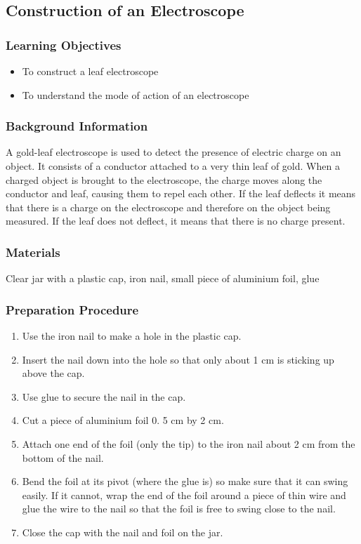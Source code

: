 \subsection{Construction of an Electroscope}

\subsubsection*{Learning Objectives}
\begin{itemize}
\item{To construct a leaf electroscope} 
\item{To understand the mode of action of an electroscope} 
\end{itemize}

\subsubsection*{Background Information}
A gold-leaf electroscope is used to detect the presence of electric charge on an object. It consists of a conductor attached to a very thin leaf of gold. When a charged object is brought to the electroscope, the charge moves along the conductor and leaf, causing them to repel each other. If the leaf deflects it means that there is a charge on the electroscope and therefore on the object being measured. If the leaf does not deflect, it means that there is no charge present. 

\subsubsection*{Materials}
Clear jar with a plastic cap, iron nail, small piece of aluminium foil, glue


\subsubsection*{Preparation Procedure}
\begin{enumerate}
\item{Use the iron nail to make a hole in the plastic cap.} 
\item{Insert the nail down into the hole so that only about 1 cm is sticking up above the cap.} 
\item{Use glue to secure the nail in the cap.} 
\item{Cut a piece of aluminium foil 0. 5 cm by 2 cm.} 
\item{Attach one end of the foil (only the tip) to the iron nail about 2 cm from the bottom of the nail.} 
\item{Bend the foil at its pivot (where the glue is) so make sure that it can swing easily. If it cannot, wrap the end of the foil around a piece of thin wire and glue the wire to the nail so that the foil is free to swing close to the nail.} 
\item{Close the cap with the nail and foil on the jar.} 
\end{enumerate}

